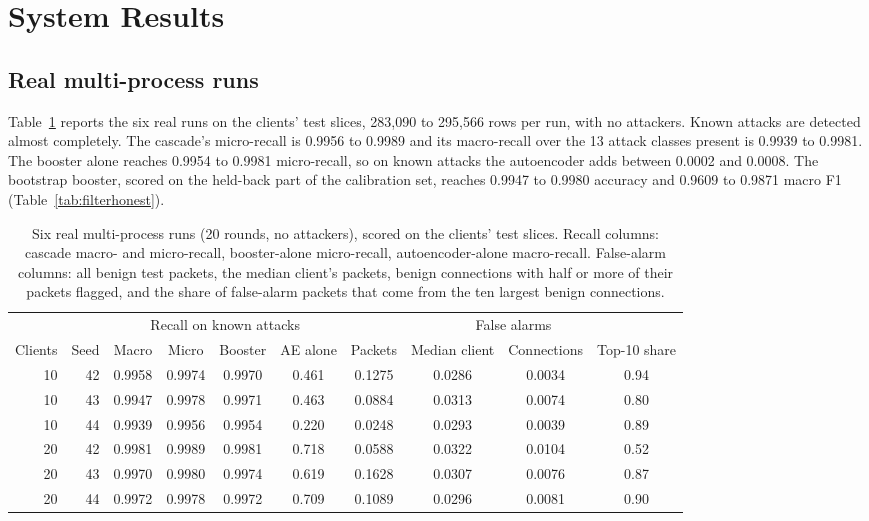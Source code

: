 \section{System Results}
\label{sec:results}
\subsection{Real multi-process runs}
\label{sec:real}
Table~\ref{tab:real} reports the six real runs on the clients' test slices, 283,090 to 295,566 rows per run, with no attackers. Known attacks are detected almost completely. The cascade's micro-recall is 0.9956 to 0.9989 and its macro-recall over the 13 attack classes present is 0.9939 to 0.9981. The booster alone reaches 0.9954 to 0.9981 micro-recall, so on known attacks the autoencoder adds between 0.0002 and 0.0008. The bootstrap booster, scored on the held-back part of the calibration set, reaches 0.9947 to 0.9980 accuracy and 0.9609 to 0.9871 macro F1 (Table~\ref{tab:filterhonest}).

\begin{table}[t]
\centering
\caption{Six real multi-process runs (20 rounds, no attackers), scored on the clients' test slices. Recall columns: cascade macro- and micro-recall, booster-alone micro-recall, autoencoder-alone macro-recall. False-alarm columns: all benign test packets, the median client's packets, benign connections with half or more of their packets flagged, and the share of false-alarm packets that come from the ten largest benign connections.}
\label{tab:real}
\small
\begin{adjustbox}{max width=\linewidth}
\begin{tabular}{rrcccccccc}
\toprule
 & & \multicolumn{4}{c}{Recall on known attacks} & \multicolumn{4}{c}{False alarms} \\
\cmidrule(lr){3-6}\cmidrule(lr){7-10}
Clients & Seed & Macro & Micro & Booster & AE alone & Packets & Median client & Connections & Top-10 share \\
\midrule
10 & 42 & 0.9958 & 0.9974 & 0.9970 & 0.461 & 0.1275 & 0.0286 & 0.0034 & 0.94 \\
10 & 43 & 0.9947 & 0.9978 & 0.9971 & 0.463 & 0.0884 & 0.0313 & 0.0074 & 0.80 \\
10 & 44 & 0.9939 & 0.9956 & 0.9954 & 0.220 & 0.0248 & 0.0293 & 0.0039 & 0.89 \\
20 & 42 & 0.9981 & 0.9989 & 0.9981 & 0.718 & 0.0588 & 0.0322 & 0.0104 & 0.52 \\
20 & 43 & 0.9970 & 0.9980 & 0.9974 & 0.619 & 0.1628 & 0.0307 & 0.0076 & 0.87 \\
20 & 44 & 0.9972 & 0.9978 & 0.9972 & 0.709 & 0.1089 & 0.0296 & 0.0081 & 0.90 \\
\bottomrule
\end{tabular}
\end{adjustbox}
\end{table}

